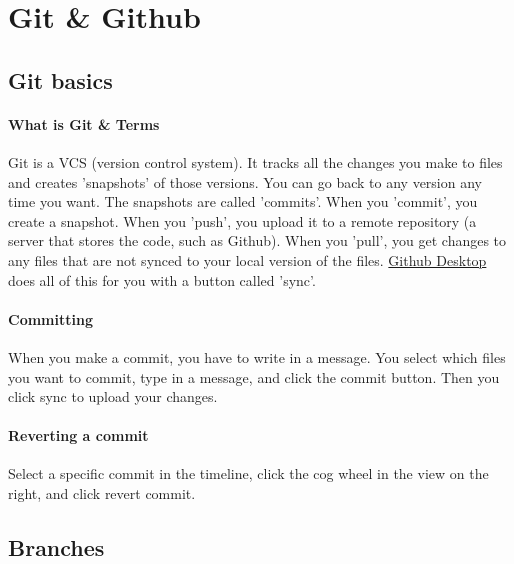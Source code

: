 \documentclass[12p,a4paper]{article}
\begin{document}
\section{Git \& Github}
\subsection{Git basics}

\paragraph{What is Git \& Terms} Git is a VCS (version control system). It tracks all the changes you make to files and creates 'snapshots' of those versions. You can go back to any version any time you want. The snapshots are called 'commits'. When you 'commit', you create a snapshot. When you 'push', you upload it to a remote repository (a server that stores the code, such as Github). When you 'pull', you get changes to any files that are not synced to your local version of the files. \href{https://desktop.github.com}{Github Desktop} does all of this for you with a button called 'sync'. 

\paragraph{Committing} When you make a commit, you have to write in a message. You select which files you want to commit, type in a message, and click the commit button. Then you click sync to upload your changes.

\paragraph{Reverting a commit} Select a specific commit in the timeline, click the cog wheel in the view on the right, and click revert commit.

\subsection{Branches}
\end{document}
